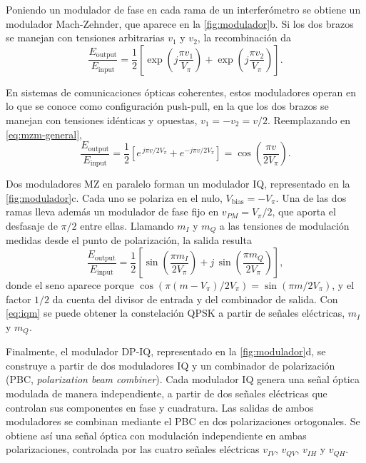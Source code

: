 Poniendo un modulador de fase en cada rama de un interfer\'ometro se obtiene
un modulador Mach-Zehnder, que aparece en la \cref{fig:modulador}b. Si los dos
brazos se manejan con tensiones arbitrarias $v_1$ y $v_2$, la recombinaci\'on
da
\begin{equation}
  \frac{E_{\mathrm{output}}}{E_{\mathrm{input}}}
     = \frac{1}{2}\left[
       \exp\!\left(j\frac{\pi v_1}{V_\pi}\right) +
       \exp\!\left(j\frac{\pi v_2}{V_\pi}\right)\right].
  \label{eq:mzm-general}
\end{equation}

En sistemas de comunicaciones \'opticas coherentes, estos moduladores operan
en lo que se conoce como configuraci\'on push-pull, en la que los dos brazos
se manejan con tensiones id\'enticas y opuestas, $v_1 = -v_2 = v/2$.
Reemplazando en \eqref{eq:mzm-general},
\begin{equation}
  \frac{E_{\mathrm{output}}}{E_{\mathrm{input}}}
     = \frac{1}{2}\left[
       e^{\,j\pi v/2V_\pi} + e^{-j\pi v/2V_\pi}\right]
     = \cos\!\left(\frac{\pi v}{2V_\pi}\right).
  \label{eq:mzm}
\end{equation}

Dos moduladores MZ en paralelo forman un modulador IQ, representado en la
\cref{fig:modulador}c. Cada uno se polariza en el nulo,
$V_{\mathrm{bias}} = -V_\pi$. Una de las dos ramas lleva adem\'as un modulador
de fase fijo en $v_{PM} = V_\pi/2$, que aporta el desfasaje de $\pi/2$ entre
ellas. Llamando $m_I$ y $m_Q$ a las tensiones de modulaci\'on medidas desde el
punto de polarizaci\'on, la salida resulta
\begin{equation}
  \frac{E_{\mathrm{output}}}{E_{\mathrm{input}}}
     = \frac{1}{2}\left[
       \sin\!\left(\frac{\pi m_I}{2V_\pi}\right) +
       j\,\sin\!\left(\frac{\pi m_Q}{2V_\pi}\right)\right],
  \label{eq:iqm}
\end{equation}
donde el seno aparece porque $\cos(\pi(m-V_\pi)/2V_\pi) = \sin(\pi m/2V_\pi)$,
y el factor $1/2$ da cuenta del divisor de entrada y del combinador de salida.
Con \eqref{eq:iqm} se puede obtener la constelaci\'on QPSK a partir de se\~nales
el\'ectricas, $m_I$ y $m_Q$.

Finalmente, el modulador DP-IQ, representado en la \cref{fig:modulador}d, se
construye a partir de dos moduladores IQ y un combinador de polarizaci\'on
(PBC, \emph{polarization beam combiner}). Cada modulador IQ genera una se\~nal
\'optica modulada de manera independiente, a partir de dos se\~nales
el\'ectricas que controlan sus componentes en fase y cuadratura. Las salidas
de ambos moduladores se combinan mediante el PBC en dos polarizaciones
ortogonales. Se obtiene as\'i una se\~nal \'optica con modulaci\'on
independiente en ambas polarizaciones, controlada por las cuatro se\~nales
el\'ectricas $v_{IV}$, $v_{QV}$, $v_{IH}$ y $v_{QH}$.



